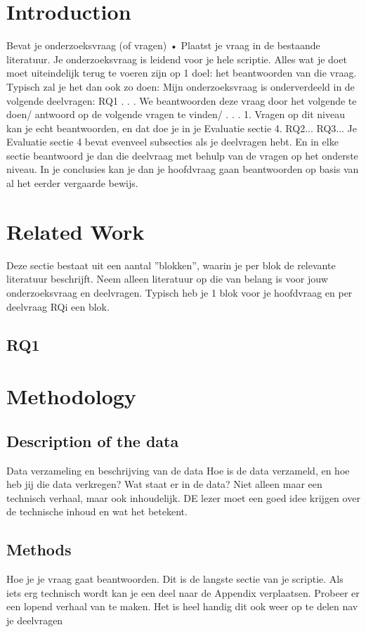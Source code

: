 \section{Introduction}

Bevat je onderzoeksvraag (of vragen)
• Plaatst je vraag in de bestaande literatuur.
Je onderzoeksvraag is leidend voor je hele scriptie. Alles wat je doet moet uiteindelijk terug te voeren zijn op 1 doel: het beantwoorden van die vraag.
Typisch zal je het dan ook zo doen:
Mijn onderzoeksvraag is onderverdeeld in de volgende deelvragen:
RQ1 . . . We beantwoorden deze vraag door het volgende te doen/ antwoord op de volgende vragen te vinden/ . . .
1. Vragen op dit niveau kan je echt beantwoorden, en dat doe je in je Evaluatie sectie 4.
RQ2...
RQ3...
Je Evaluatie sectie 4 bevat evenveel subsecties als je deelvragen hebt. En in elke sectie beantwoord je dan die deelvraag met behulp van de vragen op het onderste niveau.
In je conclusies kan je dan je hoofdvraag gaan beantwoorden op basis van al het eerder vergaarde bewijs.

\section{Related Work}
Deze sectie bestaat uit een aantal ”blokken”, waarin je per blok de relevante literatuur beschrijft.
Neem alleen literatuur op die van belang is voor jouw onderzoeksvraag en deelvragen.
Typisch heb je 1 blok voor je hoofdvraag en per deelvraag RQi een blok.

\subsection{RQ1}

\section{Methodology}
\subsection{Description of the data}
Data verzameling en beschrijving van de data
Hoe is de data verzameld, en hoe heb jij die data verkregen?
Wat staat er in de data? Niet alleen maar een technisch verhaal, maar ook
inhoudelijk. DE lezer moet een goed idee krijgen over de technische inhoud en wat het betekent.

\subsection{Methods}
Hoe je je vraag gaat beantwoorden.
Dit is de langste sectie van je scriptie.
Als iets erg technisch wordt kan je een deel naar de Appendix verplaatsen. Probeer er een lopend verhaal van te maken.
Het is heel handig dit ook weer op te delen nav je deelvragen
